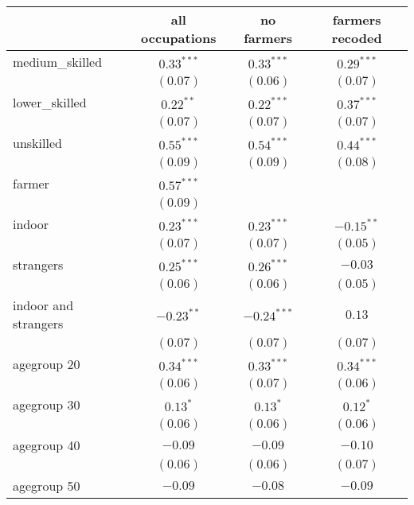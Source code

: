 
\begin{table}
\begin{center}
\begin{tabular}{l c c c}
\hline
 & all occupations & no farmers & farmers recoded \\
\hline
medium\_skilled      & $0.33^{***}$  & $0.33^{***}$  & $0.29^{***}$  \\
                     & $(0.07)$      & $(0.06)$      & $(0.07)$      \\
lower\_skilled       & $0.22^{**}$   & $0.22^{***}$  & $0.37^{***}$  \\
                     & $(0.07)$      & $(0.07)$      & $(0.07)$      \\
unskilled            & $0.55^{***}$  & $0.54^{***}$  & $0.44^{***}$  \\
                     & $(0.09)$      & $(0.09)$      & $(0.08)$      \\
farmer               & $0.57^{***}$  &               &               \\
                     & $(0.09)$      &               &               \\
indoor               & $0.23^{***}$  & $0.23^{***}$  & $-0.15^{**}$  \\
                     & $(0.07)$      & $(0.07)$      & $(0.05)$      \\
strangers            & $0.25^{***}$  & $0.26^{***}$  & $-0.03$       \\
                     & $(0.06)$      & $(0.06)$      & $(0.05)$      \\
indoor and strangers & $-0.23^{**}$  & $-0.24^{***}$ & $0.13$        \\
                     & $(0.07)$      & $(0.07)$      & $(0.07)$      \\
agegroup 20          & $0.34^{***}$  & $0.33^{***}$  & $0.34^{***}$  \\
                     & $(0.06)$      & $(0.07)$      & $(0.06)$      \\
agegroup 30          & $0.13^{*}$    & $0.13^{*}$    & $0.12^{*}$    \\
                     & $(0.06)$      & $(0.06)$      & $(0.06)$      \\
agegroup 40          & $-0.09$       & $-0.09$       & $-0.10$       \\
                     & $(0.06)$      & $(0.06)$      & $(0.07)$      \\
agegroup 50          & $-0.09$       & $-0.08$       & $-0.09$       \\

\end{tabular}
\end{center}
\end{table}
